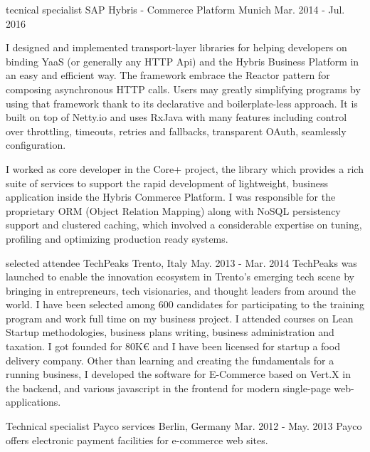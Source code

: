 \begin{cventries}
  \cventry
    {tecnical specialist} %
    {SAP Hybris - Commerce Platform} %
    {Munich} %
    {Mar. 2014 - Jul. 2016} %
    {
      \begin{cvitems}
        \item I designed and implemented transport-layer libraries for helping developers on binding YaaS (or generally any HTTP Api) and the Hybris Business Platform in an easy and efficient way.
      The framework embrace the Reactor pattern for composing asynchronous HTTP calls. Users may greatly simplifying programs by using that framework thank to its declarative and boilerplate-less
      approach. It is built on top of Netty.io and uses RxJava with many features including control over throttling, timeouts, retries and fallbacks, transparent OAuth, seamlessly configuration.
        \item I worked as core developer in the Core+ project, the library which provides a rich suite of services to support the rapid development of lightweight, business application inside the
      Hybris Commerce Platform. I was responsible for the proprietary ORM (Object Relation Mapping) along with NoSQL persistency support and clustered caching, which involved a considerable expertise on tuning,
      profiling and optimizing production ready systems.
      \end{cvitems}
    }

  \cventry
    {selected attendee} %
    {TechPeaks} %
    {Trento, Italy} %
    {May. 2013 - Mar. 2014} %
    {
    TechPeaks was launched to enable the innovation ecosystem in Trento’s emerging tech scene by bringing in entrepreneurs, tech visionaries, and thought leaders from around the world.
    I have been selected among 600 candidates for participating to the training program and work full time on my business project.
    I attended courses on Lean Startup methodologies, business plans writing, business administration and taxation.
    I got founded for 80K€ and I have been licensed for startup a food delivery company.
    Other than learning and creating the fundamentals for a running business, I developed the software for E-Commerce based on Vert.X in the backend, and various javascript in the frontend
    for modern single-page web-applications.
    }

  \cventry
    {Technical specialist} %
    {Payco services} %
    {Berlin, Germany} %
    {Mar. 2012 - May. 2013} %
    {
      Payco offers electronic payment facilities for e-commerce web sites.
    }


\end{cventries}
